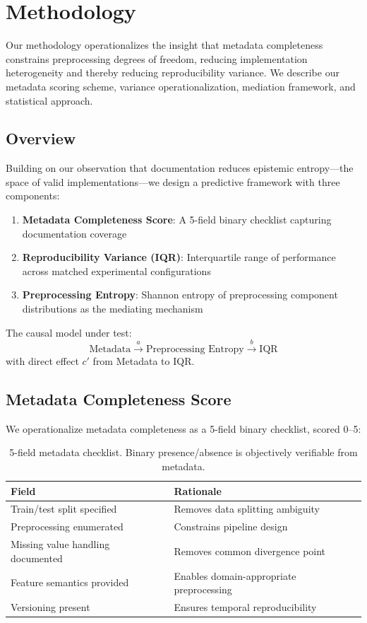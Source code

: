 \section{Methodology}

Our methodology operationalizes the insight that metadata completeness constrains preprocessing degrees of freedom, reducing implementation heterogeneity and thereby reducing reproducibility variance. We describe our metadata scoring scheme, variance operationalization, mediation framework, and statistical approach.

\subsection{Overview}

Building on our observation that documentation reduces epistemic entropy---the space of valid implementations---we design a predictive framework with three components:

\begin{enumerate}
    \item \textbf{Metadata Completeness Score}: A 5-field binary checklist capturing documentation coverage
    \item \textbf{Reproducibility Variance (IQR)}: Interquartile range of performance across matched experimental configurations
    \item \textbf{Preprocessing Entropy}: Shannon entropy of preprocessing component distributions as the mediating mechanism
\end{enumerate}

The causal model under test:
\begin{equation}
\text{Metadata} \xrightarrow{a} \text{Preprocessing Entropy} \xrightarrow{b} \text{IQR}
\end{equation}
with direct effect $c'$ from Metadata to IQR.

\subsection{Metadata Completeness Score}

We operationalize metadata completeness as a 5-field binary checklist, scored 0--5:

\begin{table}[h]
\centering
\begin{tabular}{@{}lp{5cm}@{}}
\toprule
Field & Rationale \\
\midrule
Train/test split specified & Removes data splitting ambiguity \\
Preprocessing enumerated & Constrains pipeline design \\
Missing value handling documented & Removes common divergence point \\
Feature semantics provided & Enables domain-appropriate preprocessing \\
Versioning present & Ensures temporal reproducibility \\
\bottomrule
\end{tabular}
\caption{5-field metadata checklist. Binary presence/absence is objectively verifiable from metadata.}
\label{tab:checklist}
\end{table}

